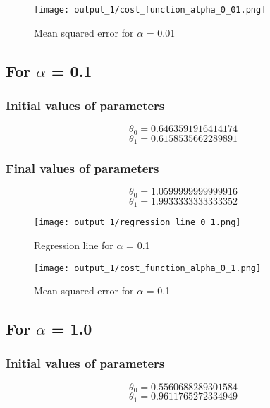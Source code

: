 \begin{figure}[!ht]
    \texttt{[image: output\_1/cost\_function\_alpha\_0\_01.png]}
    \caption{Mean squared error for $\alpha$ = 0.01}
    \label{fig:mean_square_alpha_0_01}
\end{figure}

\subsection{For $\alpha$ = 0.1}
\subsubsection{Initial values of parameters}
\begin{equation}
\theta_0 = 0.6463591916414174
\end{equation}
\begin{equation}
\theta_1 = 0.6158535662289891
\end{equation}

\subsubsection{Final values of parameters}
\begin{equation}
\theta_0 = 1.0599999999999916
\end{equation}
\begin{equation}
\theta_1 = 1.9933333333333352
\end{equation}

\begin{figure}[!ht]
    \texttt{[image: output\_1/regression\_line\_0\_1.png]}
    \caption{Regression line for $\alpha$ = 0.1}
    \label{fig:regression_line_alpha_0_1}
\end{figure}

\begin{figure}[!ht]
    \texttt{[image: output\_1/cost\_function\_alpha\_0\_1.png]}
    \caption{Mean squared error for $\alpha$ = 0.1}
    \label{fig:mean_square_alpha_0_1}
\end{figure}

\subsection{For $\alpha$ = 1.0}
\subsubsection{Initial values of parameters}
\begin{equation}
\theta_0 = 0.5560688289301584
\end{equation}
\begin{equation}
\theta_1 = 0.9611765272334949
\end{equation}

